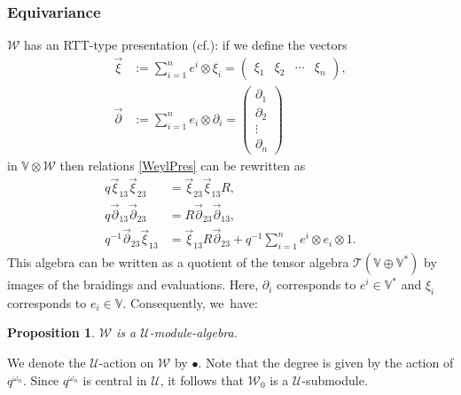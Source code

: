 \documentclass[11pt]{article}
\newcommand{\cf}{cf.\xspace}
\newtheorem{prop}[thm]{Proposition}
\theoremstyle{definition}
\newcommand{\UU}{\mathcal{U}}
\newcommand{\WW}{\mathcal{W}}
\newcommand{\del}{\partial}
\begin{document}
\subsubsection{Equivariance}
$\WW$ has an RTT-type presentation (\cf \cite[Ex.\,4.9]{JordanMult}): if we define the vectors
\begin{align*}
\vec{\xi}&:= \sum_{i=1}^n e^i\otimes \xi_i
=
\begin{pmatrix}
\xi_1 & \xi_2 & \cdots & \xi_n
\end{pmatrix}\!,
\\
\vec{\del}&:=\sum_{i=1}^ne_i\otimes \del_i
=
\begin{pmatrix}
\partial_1\\
\partial_2\\
\vdots\\
\partial_n
\end{pmatrix}
\end{align*}
in $\mathbb{V}\otimes\WW$ then relations \eqref{WeylPres} can be rewritten as
\begin{equation*}
\begin{aligned}
q\vec{\xi}_{13}\vec{\xi}_{23}&=\vec{\xi}_{23}\vec{\xi}_{13}R,\\
q\vec{\del}_{13}\vec{\del}_{23}&=R\vec{\del}_{23}\vec{\del}_{13},\\[-6pt]
q^{-1}\vec{\del}_{23}\vec{\xi}_{13}&=\vec{\xi}_{13}R\vec{\del}_{23}+q^{-1}\sum_{i=1}^n e^i\otimes e_i\otimes 1.
\end{aligned}
\end{equation*}
This algebra can be written as a quotient of the tensor algebra $\mathcal{T}(\mathbb{V}\oplus\mathbb{V}^*)$ by images of the braidings and evaluations.
Here, $\del_i$ corresponds to $e^i\in\mathbb{V}^*$ and $\xi_i$ corresponds to $e_i\in\mathbb{V}$.
Consequently, we~have:
\begin{prop}\label{WeylEquiv}
$\WW$ is a $\UU$-module-algebra.
\end{prop}
We denote the $\UU$-action on $\WW$ by $\bullet$.
Note that the degree is given by the action of $q^{\omega_n}$.
Since $q^{\omega_n}$ is central in $\UU$, it follows that $\WW_0$ is a $\UU$-submodule.
\end{document}

